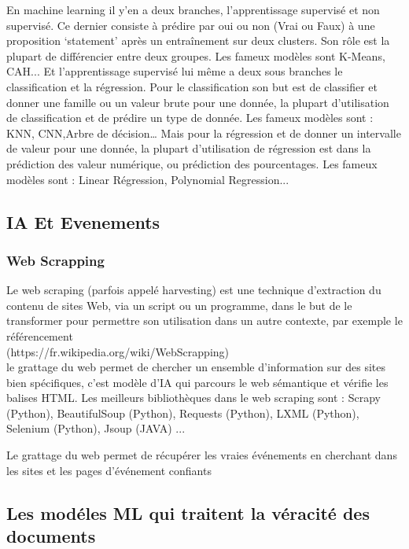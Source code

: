 \documentclass[12pt]{report}
\begin{document}
En machine learning il y’en a deux branches, l’apprentissage supervisé et non supervisé.
Ce dernier consiste à prédire par oui ou non (Vrai ou Faux) à une proposition ‘statement’ après un entraînement sur deux clusters. Son rôle est la plupart de différencier entre deux groupes. Les fameux modèles sont K-Means, CAH...
Et l’apprentissage supervisé lui même a deux sous branches le classification et la régression.
Pour le classification son but est de classifier et donner une famille ou un valeur brute pour une donnée, la plupart d’utilisation de classification et de prédire un type de donnée. Les fameux modèles sont : KNN, CNN,Arbre de décision…
Mais pour la régression et de donner un intervalle de valeur pour une donnée, la plupart d’utilisation de régression est dans la prédiction des valeur numérique, ou prédiction des pourcentages. Les fameux modèles sont : Linear Régression, Polynomial Regression...
\subsection{IA Et Evenements}

\subsubsection{Web Scrapping}
Le web scraping (parfois appelé harvesting) est une technique
d'extraction du contenu de sites Web, via un script ou un programme, dans
le but de le transformer pour permettre son utilisation dans un autre
contexte, par exemple le référencement\\
(https://fr.wikipedia.org/wiki/WebScrapping)\\
le grattage du web permet de chercher un ensemble 
d’information sur des
sites bien spécifiques, c’est modèle d’IA qui parcours 
le web sémantique et
vérifie les balises HTML.
Les meilleurs bibliothèques dans le web scraping sont :
Scrapy (Python), BeautifulSoup (Python), Requests (Python), LXML
(Python), Selenium (Python), Jsoup (JAVA) ...

Le grattage du web permet de récupérer les vraies événements 
en cherchant dans les sites et les pages d'événement 
confiants

\subsection{Les modéles ML qui traitent la véracité des documents}
\end{document}
